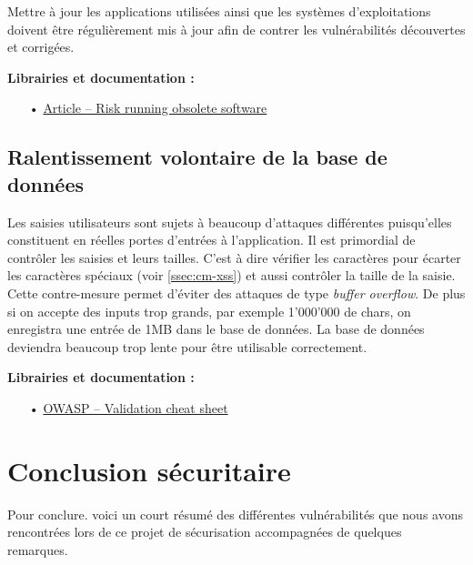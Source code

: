 \documentclass[12pt]{article}
\begin{document}
Mettre à jour les applications utilisées ainsi que les systèmes d'exploitations doivent être régulièrement mis à jour afin de contrer les vulnérabilités découvertes et corrigées.

\medskip
\textbf{Librairies et documentation :}

\begin{itemize}
\item[•] \href{http://techgenix.com/risk-running-obsolete-software-part1/}{Article -- Risk running obsolete software}
\end{itemize}

\subsection{Ralentissement volontaire de la base de données}
\label{ssec:cm-oversizing}

Les saisies utilisateurs sont sujets à beaucoup d'attaques différentes puisqu'elles constituent en réelles portes d'entrées à l'application. Il est primordial de contrôler les saisies et leurs tailles. C'est à dire vérifier les caractères pour écarter les caractères spéciaux (voir \autoref{ssec:cm-xss}) et aussi contrôler la taille de la saisie. Cette contre-mesure permet d'éviter des attaques de type \emph{buffer overflow}. De plus si on accepte des inputs trop grands, par exemple  1'000'000 de chars, on enregistra une entrée de 1MB dans le base de données. La base de données deviendra beaucoup trop lente pour être utilisable correctement.

\medskip
\textbf{Librairies et documentation :}

\begin{itemize}
\item[•] \href{https://www.owasp.org/index.php/Input_Validation_Cheat_Sheet}{OWASP -- Validation cheat sheet}
\end{itemize}

\clearpage
\section{Conclusion sécuritaire}
\label{sec:conclusion}

Pour conclure. voici un court résumé des différentes vulnérabilités que nous avons rencontrées lors de ce projet de sécurisation accompagnées de quelques remarques.
\vspace{5mm}
\end{document}
